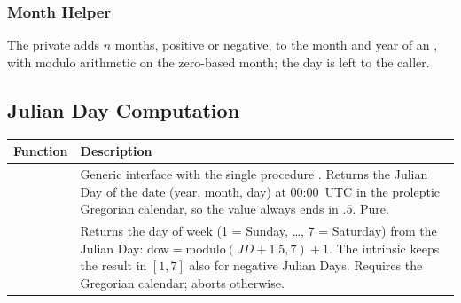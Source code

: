 \subsubsection{Month Helper}

The private  adds $n$ months, positive or
negative, to the month and year of an , with modulo
arithmetic on the zero-based month; the day is left to the caller.

\subsection{Julian Day Computation}
\label{subsec:date_julian}

\begin{longtable}{L{5cm} L{9cm}}
  \toprule
  \textbf{Function} & \textbf{Description} \\
  \midrule
  \endhead
  \bottomrule
  \endfoot
   &
    Generic interface with the single procedure .
    Returns the Julian Day of the date (year, month, day) at 00:00~UTC in
    the proleptic Gregorian calendar, so the value always ends in $.5$.
    Pure. \\
   &
    Returns the day of week (1 = Sunday, \ldots, 7 = Saturday) from the
    Julian Day: $\text{dow} = \text{modulo}(JD + 1.5, 7) + 1$. The
     intrinsic keeps the result in $[1,7]$ also for negative
    Julian Days. Requires the Gregorian calendar; aborts otherwise. \\
\end{longtable}

